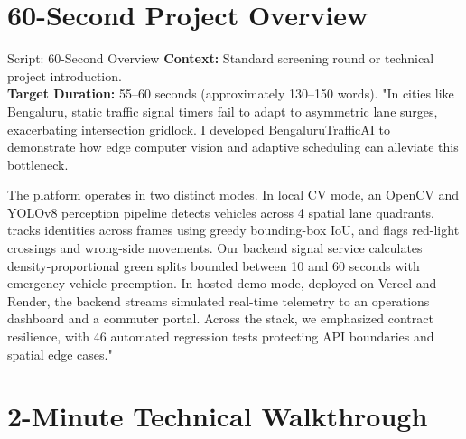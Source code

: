 \documentclass[11pt,a4paper,oneside]{report}
\begin{document}
\section{60-Second Project Overview}
\label{sec:script_60s}

\begin{interviewq}{Script: 60-Second Overview}
\textbf{Context:} Standard screening round or technical project introduction.\\
\textbf{Target Duration:} 55--60 seconds (approximately 130--150 words).
\tcblower
"In cities like Bengaluru, static traffic signal timers fail to adapt to asymmetric lane surges, exacerbating intersection gridlock. I developed BengaluruTrafficAI to demonstrate how edge computer vision and adaptive scheduling can alleviate this bottleneck.

The platform operates in two distinct modes. In local CV mode, an OpenCV and YOLOv8 perception pipeline detects vehicles across 4 spatial lane quadrants, tracks identities across frames using greedy bounding-box IoU, and flags red-light crossings and wrong-side movements. Our backend signal service calculates density-proportional green splits bounded between 10 and 60 seconds with emergency vehicle preemption. In hosted demo mode, deployed on Vercel and Render, the backend streams simulated real-time telemetry to an operations dashboard and a commuter portal. Across the stack, we emphasized contract resilience, with 46 automated regression tests protecting API boundaries and spatial edge cases."
\end{interviewq}

\section{2-Minute Technical Walkthrough}
\label{sec:script_2min}
\end{document}
